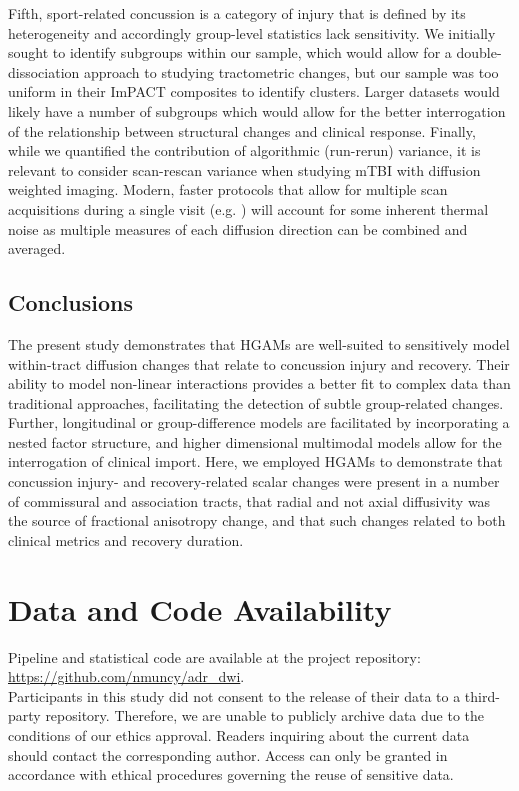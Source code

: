 \documentclass[12pt]{article}
\begin{document}
Fifth, sport-related concussion is a category of injury that is defined by its heterogeneity and accordingly group-level statistics lack sensitivity. We initially sought to identify subgroups within our sample, which would allow for a double-dissociation approach to studying tractometric changes, but our sample was too uniform in their ImPACT composites to identify clusters. Larger datasets would likely have a number of subgroups which would allow for the better interrogation of the relationship between structural changes and clinical response. Finally, while we quantified the contribution of algorithmic (run-rerun) variance, it is relevant to consider scan-rescan variance when studying mTBI with diffusion weighted imaging. Modern, faster protocols that allow for multiple scan acquisitions during a single visit (e.g. \cite{li2020EvaluationMultishellDiffusion}) will account for some inherent thermal noise as multiple measures of each diffusion direction can be combined and averaged.


\subsection{Conclusions}
\label{ssec:disc-conc}
The present study demonstrates that HGAMs are well-suited to sensitively model within-tract diffusion changes that relate to concussion injury and recovery. Their ability to model non-linear interactions provides a better fit to complex data than traditional approaches, facilitating the detection of subtle group-related changes. Further, longitudinal or group-difference models are facilitated by incorporating a nested factor structure, and higher dimensional multimodal models allow for the interrogation of clinical import. Here, we employed HGAMs to demonstrate that concussion injury- and recovery-related scalar changes were present in a number of commissural and association tracts, that radial and not axial diffusivity was the source of fractional anisotropy change, and that such changes related to both clinical metrics and recovery duration.


\section*{Data and Code Availability}
\label{sec:xtr-dca}
Pipeline and statistical code are available at the project repository: \url{https://github.com/nmuncy/adr_dwi}.\\

\noindent Participants in this study did not consent to the release of their data to a third-party repository. Therefore, we are unable to publicly archive data due to the conditions of our ethics approval. Readers inquiring about the current data should contact the corresponding author. Access can only be granted in accordance with ethical procedures governing the reuse of sensitive data.
\end{document}
